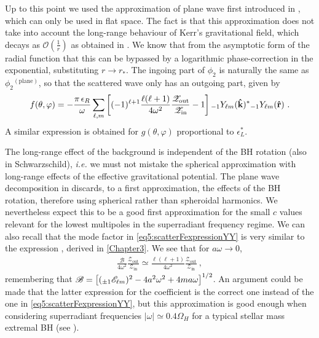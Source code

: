 Up to this point we used the approximation of plane wave first introduced in , which can only be used in flat space. The fact is that this approximation does not take into account the long-range behaviour of Kerr's gravitational field, which decays as $\mathscr{O}(\tfrac{1}{r})$ as obtained in .
We know that from the asymptotic form of the radial function that this can be bypassed by a logarithmic phase-correction in the exponential, substituting $r\to r_{*}$.
The ingoing part of $\phi_2$ is naturally the same as $\phi_2{}^{(\mathrm{plane})}$, so that the scattered wave only has an outgoing part, given by
\begin{align}
    \label{eq5:scatterFexpressionYY}
    f(\theta,\varphi) = - \frac{\pi \,\epsilon_R}{\omega} \sum_{\ell,m} \left[
    (-1)^{\ell+1} \frac{\ell(\ell+1)}{4 \omega^2 }
    \frac{\mathscr{Z}_\mathrm{out}}{\mathscr{Z}_\mathrm{in}} - 1 \right]
    \uu[-1]{Y}{\ell m}(\mathbf{\hat{k}})^{*} \uu[-1]{Y}{\ell m}(\mathbf{\hat{r}}) ~.
\end{align}
A similar expression is obtained for $g(\theta,\varphi)$ proportional to $\epsilon_L^*$.

The long-range effect of the background is independent of the BH rotation (also in Schwarzschild), \emph{i.e.} we must not mistake the spherical approximation with long-range effects of the effective gravitational potential.
The plane wave decomposition in  discards, to a first approximation, the effects of the BH rotation, therefore using spherical rather than spheroidal harmonics.
We nevertheless expect this to be a good first approximation for the small $c$ values relevant for the lowest multipoles in the superradiant frequency regime.
We can also recall that the mode factor in \eqref{eq5:scatterFexpressionYY} is very similar to the expression , derived in \cref{Chapter3}.
We see that for $a\omega \to 0$,
\begin{align}
    \label{eq5:phaseFactor}
    \frac{\mathscr{B}}{4 \omega^2} \frac{\mathscr{Z}_\mathrm{out}}{\mathscr{Z}_\mathrm{in}} \simeq \frac{\ell(\ell+1)}{4 \omega^2} \frac{\mathscr{Z}_\mathrm{out}}{\mathscr{Z}_\mathrm{in}} ~,
\end{align}
remembering that $\mathscr{B} = \left[ (\uu[\pm 1]{\mathscr{E}}{\ell m})^2 - 4 a^2 \omega^2 + 4 m a \omega \right]^{1/2}$.
An argument could be made that the latter expression for the coefficient is the correct one instead of the one in \eqref{eq5:scatterFexpressionYY}, but this approximation is good enough when considering superradiant frequencies $|\omega| \simeq 0.4 \Omega_H$ for a typical stellar mass extremal BH (see ).

